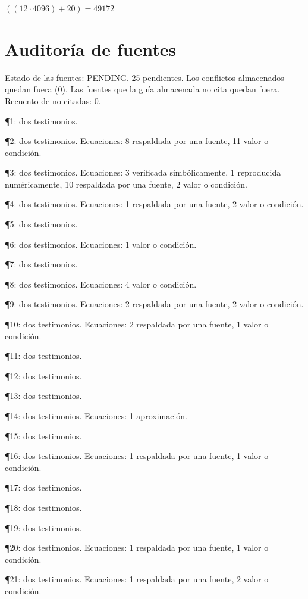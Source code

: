 \documentclass{book}
\begin{document}
\(\left(\left(12\cdot 4096\right)+20\right) = 49172\)
\chapter{Auditoría de fuentes}

\noindent Estado de las fuentes: PENDING. 25 pendientes. Los conflictos almacenados quedan fuera (0). Las fuentes que la guía almacenada no cita quedan fuera. Recuento de no citadas: 0.

\noindent ¶1: dos testimonios.

\noindent ¶2: dos testimonios. Ecuaciones: 8 respaldada por una fuente, 11 valor o condición.

\noindent ¶3: dos testimonios. Ecuaciones: 3 verificada simbólicamente, 1 reproducida numéricamente, 10 respaldada por una fuente, 2 valor o condición.

\noindent ¶4: dos testimonios. Ecuaciones: 1 respaldada por una fuente, 2 valor o condición.

\noindent ¶5: dos testimonios.

\noindent ¶6: dos testimonios. Ecuaciones: 1 valor o condición.

\noindent ¶7: dos testimonios.

\noindent ¶8: dos testimonios. Ecuaciones: 4 valor o condición.

\noindent ¶9: dos testimonios. Ecuaciones: 2 respaldada por una fuente, 2 valor o condición.

\noindent ¶10: dos testimonios. Ecuaciones: 2 respaldada por una fuente, 1 valor o condición.

\noindent ¶11: dos testimonios.

\noindent ¶12: dos testimonios.

\noindent ¶13: dos testimonios.

\noindent ¶14: dos testimonios. Ecuaciones: 1 aproximación.

\noindent ¶15: dos testimonios.

\noindent ¶16: dos testimonios. Ecuaciones: 1 respaldada por una fuente, 1 valor o condición.

\noindent ¶17: dos testimonios.

\noindent ¶18: dos testimonios.

\noindent ¶19: dos testimonios.

\noindent ¶20: dos testimonios. Ecuaciones: 1 respaldada por una fuente, 1 valor o condición.

\noindent ¶21: dos testimonios. Ecuaciones: 1 respaldada por una fuente, 2 valor o condición.
\end{document}
